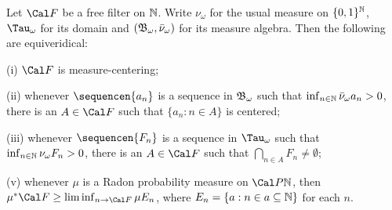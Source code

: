 Let $\Cal F$ be a free filter on $\Bbb N$.   Write
$\nu_{\omega}$ for the usual measure on $\{0,1\}^{\Bbb N}$,
$\Tau_{\omega}$ for its domain and $(\frak B_{\omega},\bar\nu_{\omega})$
for its measure algebra.   Then the following are equiveridical:

(i) $\Cal F$ is measure-centering;

(ii) whenever $\sequencen{a_n}$ is a sequence in $\frak B_{\omega}$ such
that $\inf_{n\in\Bbb N}\bar\nu_{\omega}a_n>0$, there is an $A\in\Cal F$
such that $\{a_n:n\in A\}$ is centered;

(iii) whenever $\sequencen{F_n}$ is a sequence in $\Tau_{\omega}$ such that
$\inf_{n\in\Bbb N}\nu_{\omega}F_n>0$, there is an $A\in\Cal F$ such that
$\bigcap_{n\in A}F_n\ne\emptyset$;


(v) whenever $\mu$ is a Radon probability measure on $\Cal P\Bbb N$, then
$\mu^*\Cal F\ge\liminf_{n\to\Cal F}\mu E_n$, where
$E_n=\{a:n\in a\subseteq\Bbb N\}$ for each $n$.

